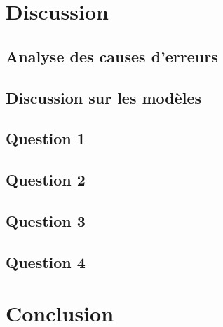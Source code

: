 \documentclass[11pt,letterpaper]{article}
\begin{document}
\section{Discussion}

\subsection{Analyse des causes d'erreurs}

\subsection{Discussion sur les modèles}

\subsection{Question 1}

\subsection{Question 2}

\subsection{Question 3}

\subsection{Question 4}

\section{Conclusion}



\clearpage

% 
% 
\end{document}
